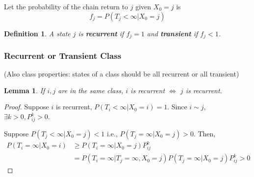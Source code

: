 \documentclass[11pt,a4paper]{article}
\newtheorem{definition}{Definition}
\newtheorem{lemma}{Lemma}
\begin{document}
Let the probability of the chain return to $j$ given $X_0=j$ is $$f_j=P(T_j<\infty|X_0=j)$$

\begin{definition}
    A state $j$ is \textbf{recurrent} if $f_j=1$ and \textbf{transient} if $f_j<1$.
\end{definition}

\subsubsection{Recurrent or Transient Class}
(Also class properties: states of a class should be all recurrent or all transient)
\begin{lemma}
    If $i,j$ are in the same class, $i$ is recurrent $\Leftrightarrow$ $j$ is recurrent.
\end{lemma}
\begin{proof}
    Suppose $i$ is recurrent, $P(T_i<\infty|X_0=i)=1$. Since $i\sim j$, $\exists k>0,P_{ij}^k>0$.

    Suppose $P(T_j<\infty|X_0=j)<1$ i.e., $P(T_j=\infty|X_0=j)>0$. Then,
    \begin{equation}
        \begin{aligned}
            P(T_i=\infty|X_0=i)&\geq P(T_i=\infty|X_0=j)P_{ij}^k\\
            &=P(T_i=\infty| T_j=\infty, X_0=j)P(T_j=\infty| X_0=j)P_{ij}^k>0
        \end{aligned}
        \nonumber
    \end{equation}
\end{proof}
\end{document}
